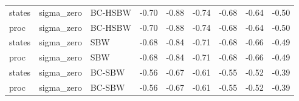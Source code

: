 \begin{table}[ht]
\begin{tabular}{lllrrrrrr}
  states & sigma\_zero & BC-HSBW & -0.70 & -0.88 & -0.74 & -0.68 & -0.64 & -0.50 \\ 
  proc & sigma\_zero & BC-HSBW & -0.70 & -0.88 & -0.74 & -0.68 & -0.64 & -0.50 \\ 
  states & sigma\_zero & SBW & -0.68 & -0.84 & -0.71 & -0.68 & -0.66 & -0.49 \\ 
  proc & sigma\_zero & SBW & -0.68 & -0.84 & -0.71 & -0.68 & -0.66 & -0.49 \\ 
  states & sigma\_zero & BC-SBW & -0.56 & -0.67 & -0.61 & -0.55 & -0.52 & -0.39 \\ 
  proc & sigma\_zero & BC-SBW & -0.56 & -0.67 & -0.61 & -0.55 & -0.52 & -0.39 \\ 
   \hline
\end{tabular}
\end{table}

